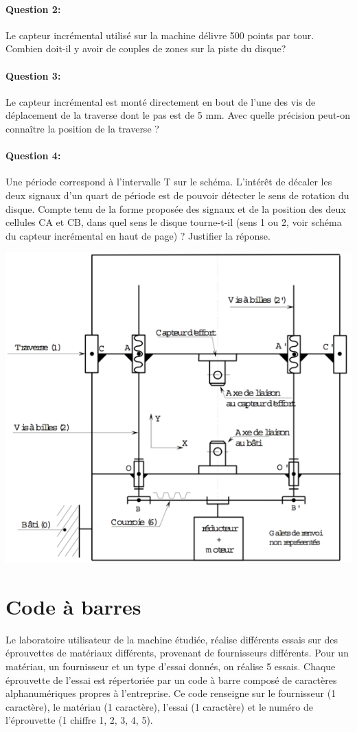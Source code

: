 \paragraph{Question 2:} Le capteur incrémental utilisé sur la machine délivre 500 points par tour. Combien doit-il y avoir de couples de zones sur la piste du disque?

\paragraph{Question 3:} Le capteur incrémental est monté directement en bout de l'une des vis de déplacement de la traverse dont le pas est de 5 mm. Avec quelle précision peut-on connaître la position de la traverse ?

\paragraph{Question 4:} Une période correspond à l'intervalle T sur le schéma. L'intérêt de décaler les deux signaux d'un quart de période est de pouvoir détecter le sens de rotation du disque. Compte tenu de la forme proposée des signaux et de la position des deux cellules CA et CB, dans quel sens le disque tourne-t-il (sens 1 ou 2, voir schéma du capteur incrémental en haut de page) ? Justifier la réponse. 

\begin{center}
 \includegraphics[width=0.6\linewidth]{img/figure05}
\end{center}

\section{Code à barres}

Le laboratoire utilisateur de la machine étudiée, réalise différents essais sur des éprouvettes de matériaux différents, provenant de fournisseurs différents. Pour un matériau, un fournisseur et un type d'essai donnés, on réalise 5 essais. Chaque éprouvette de l'essai est répertoriée par un code à barre composé de caractères alphanumériques propres à l'entreprise. Ce code renseigne sur le fournisseur (1 caractère), le matériau (1 caractère), l'essai (1 caractère) et le numéro de l'éprouvette (1 chiffre {1, 2, 3, 4, 5}).

